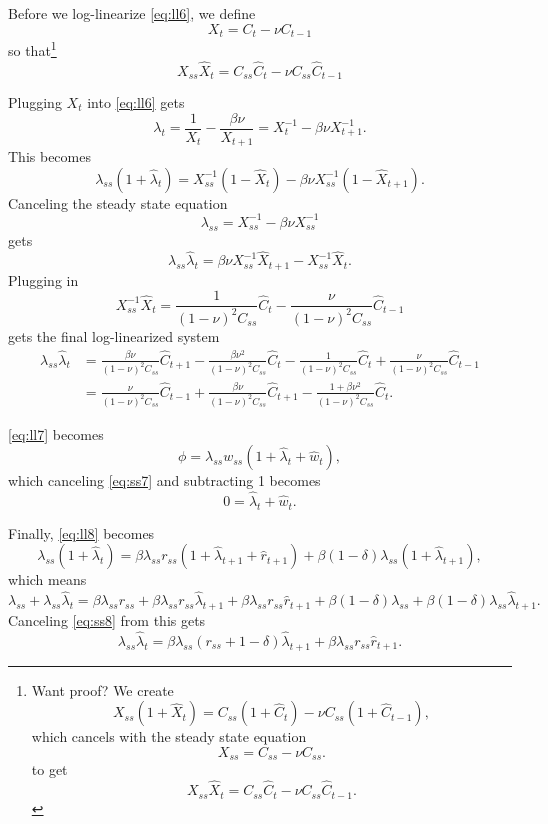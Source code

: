 \documentclass[11pt]{article}
\numberwithin{equation}{section} %
\numberwithin{figure}{section} %
\numberwithin{table}{section} %
\theoremstyle{definition}
\begin{document}
Before we log-linearize \ref{eq:ll6}, we define
\[
    X_t = C_t - \nu C_{t-1}
\]
so that\footnote{
    Want proof? We create
    \[
        X_{ss} (1 + \hat{X}_t) = C_{ss} (1 + \hat{C}_t) - \nu C_{ss} (1 + \hat{C}_{t-1}),
    \]
    which cancels with the steady state equation
    \[
        X_{ss} = C_{ss} - \nu C_{ss}.
    \]
    to get
    \[
        X_{ss} \hat{X}_t = C_{ss} \hat{C}_t - \nu C_{ss} \hat{C}_{t-1}.
    \]
}
\[
    X_{ss} \hat{X}_t = C_{ss} \hat{C}_t - \nu C_{ss} \hat{C}_{t-1}
\]

Plugging $X_t$ into \ref{eq:ll6} gets
\[
    \lambda_t = \frac{1}{X_{t}} - \frac{\beta \nu}{X_{t+1}} = X_{t}^{-1} - \beta \nu X_{t+1}^{-1}.
\]
This becomes
\[
    \lambda_{ss} (1 + \hat{\lambda}_t) = X_{ss}^{-1} (1 - \hat{X}_t) - \beta \nu X_{ss}^{-1} (1 - \hat{X}_{t+1}).
\]
Canceling the steady state equation
\[
    \lambda_{ss} = X_{ss}^{-1} - \beta \nu X_{ss}^{-1}
\]
gets
\[
    \lambda_{ss} \hat{\lambda}_t = \beta \nu X_{ss}^{-1} \hat{X}_{t+1} - X_{ss}^{-1} \hat{X}_t.
\]
Plugging in 
\[
    X_{ss}^{-1} \hat{X}_t = \frac{1}{(1 - \nu)^2 C_{ss}} \hat{C}_t - \frac{\nu}{(1 - \nu)^2 C_{ss}} \hat{C}_{t-1}
\]
gets the final log-linearized system
\begin{align*}
    \lambda_{ss} \hat{\lambda}_t &= \frac{\beta \nu}{(1 - \nu)^2 C_{ss}} \hat{C}_{t+1} - \frac{\beta \nu^2}{(1 - \nu)^2 C_{ss}} \hat{C}_t - \frac{1}{(1 - \nu)^2 C_{ss}} \hat{C}_t + \frac{\nu}{(1 - \nu)^2 C_{ss}} \hat{C}_{t-1} \\
    &= \frac{\nu}{(1 - \nu)^2 C_{ss}} \hat{C}_{t-1} + \frac{\beta \nu}{(1 - \nu)^2 C_{ss}} \hat{C}_{t+1} - \frac{1 + \beta \nu^2}{(1 - \nu)^2 C_{ss}} \hat{C}_t.
\end{align*}

\ref{eq:ll7} becomes
\[
    \phi = \lambda_{ss} w_{ss} (1 + \hat{\lambda}_t + \hat{w}_t),
\]
which canceling \ref{eq:ss7} and subtracting 1 becomes
\[
    0 = \hat{\lambda}_t + \hat{w}_t.
\]

Finally, \ref{eq:ll8} becomes
\[
    \lambda_{ss} (1 + \hat{\lambda}_t) = \beta \lambda_{ss} r_{ss} (1 + \hat{\lambda}_{t+1} + \hat{r}_{t+1}) + \beta (1-\delta) \lambda_{ss} (1 + \hat{\lambda}_{t+1}),
\]
which means
\[
    \lambda_{ss} + \lambda_{ss} \hat{\lambda}_t = \beta \lambda_{ss} r_{ss} + \beta \lambda_{ss} r_{ss} \hat{\lambda}_{t+1} + \beta \lambda_{ss} r_{ss} \hat{r}_{t+1} + \beta (1-\delta) \lambda_{ss} + \beta (1-\delta) \lambda_{ss} \hat{\lambda}_{t+1}.
\]
Canceling \ref{eq:ss8} from this gets
\[
    \lambda_{ss} \hat{\lambda}_t = \beta \lambda_{ss} (r_{ss} + 1 - \delta) \hat{\lambda}_{t+1} + \beta \lambda_{ss} r_{ss} \hat{r}_{t+1}.
\]
\end{document}
